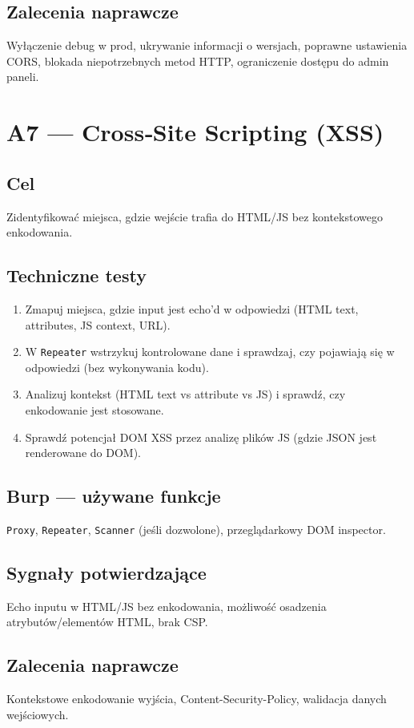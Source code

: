 \documentclass[11pt,a4paper]{article}
\begin{document}
	\subsection*{Zalecenia naprawcze}
	Wyłączenie debug w prod, ukrywanie informacji o wersjach, poprawne ustawienia CORS, blokada niepotrzebnych metod HTTP, ograniczenie dostępu do admin paneli.
	
	\newpage
	\section{A7 --- Cross‑Site Scripting (XSS)}
	\subsection*{Cel}
	Zidentyfikować miejsca, gdzie wejście trafia do HTML/JS bez kontekstowego enkodowania.
	
	\subsection*{Techniczne testy}
	\begin{enumerate}[leftmargin=*,label=\arabic*)]
		\item Zmapuj miejsca, gdzie input jest echo'd w odpowiedzi (HTML text, attributes, JS context, URL).
		\item W \texttt{Repeater} wstrzykuj kontrolowane dane i sprawdzaj, czy pojawiają się w odpowiedzi (bez wykonywania kodu).
		\item Analizuj kontekst (HTML text vs attribute vs JS) i sprawdź, czy enkodowanie jest stosowane.
		\item Sprawdź potencjał DOM XSS przez analizę plików JS (gdzie JSON jest renderowane do DOM).
	\end{enumerate}
	
	\subsection*{Burp --- używane funkcje}
	\texttt{Proxy}, \texttt{Repeater}, \texttt{Scanner} (jeśli dozwolone), przeglądarkowy DOM inspector.
	
	\subsection*{Sygnały potwierdzające}
	Echo inputu w HTML/JS bez enkodowania, możliwość osadzenia atrybutów/elementów HTML, brak CSP.
	
	\subsection*{Zalecenia naprawcze}
	Kontekstowe enkodowanie wyjścia, Content-Security-Policy, walidacja danych wejściowych.
	
\end{document}
